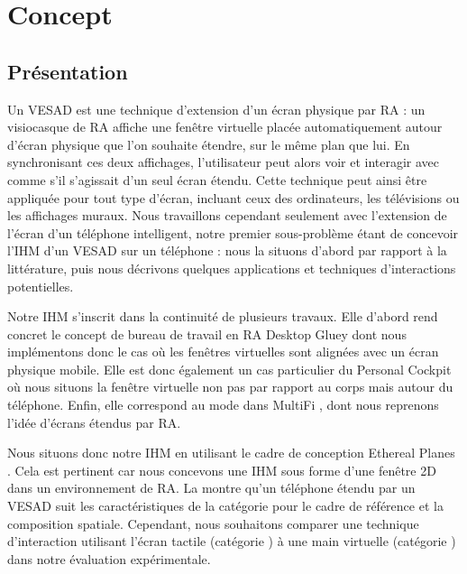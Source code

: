 \chapter{Concept}
\label{ch:concept}

\section{Présentation}
\label{sec:concept_introduction}

Un VESAD est une technique d'extension d'un écran physique par RA : un visiocasque de RA affiche une fenêtre virtuelle placée automatiquement autour d'écran physique que l'on souhaite étendre, sur le même plan que lui. En synchronisant ces deux affichages, l'utilisateur peut alors voir et interagir avec comme s'il s'agissait d'un seul écran étendu. Cette technique peut ainsi être appliquée pour tout type d'écran, incluant ceux des ordinateurs, les télévisions ou les affichages muraux. Nous travaillons cependant seulement avec l'extension de l'écran d'un téléphone intelligent, notre premier sous-problème étant de concevoir l'IHM d'un VESAD sur un téléphone : nous la situons d'abord par rapport à la littérature, puis nous décrivons quelques applications et techniques d'interactions potentielles.

Notre IHM s'inscrit dans la continuité de plusieurs travaux. Elle d'abord rend concret le concept de bureau de travail en RA Desktop Gluey \citep{Serrano2015a} dont nous implémentons donc le cas où les fenêtres virtuelles sont alignées avec un écran physique mobile. Elle est donc également un cas particulier du Personal Cockpit \citep{Ens2014} où nous situons la fenêtre virtuelle non pas par rapport au corps mais autour du téléphone. Enfin, elle correspond au mode  dans MultiFi \citep{Grubert2015}, dont nous reprenons l'idée d'écrans étendus par RA.

Nous situons donc notre IHM en utilisant le cadre de conception Ethereal Planes \citep{Ens2014a}. Cela est pertinent car nous concevons une IHM sous forme d'une fenêtre 2D dans un environnement de RA. La  montre qu'un téléphone étendu par un VESAD suit les caractéristiques de la catégorie  pour le cadre de référence et la composition spatiale. Cependant, nous souhaitons comparer une technique d'interaction utilisant l'écran tactile (catégorie ) à une main virtuelle (catégorie ) dans notre évaluation expérimentale.


